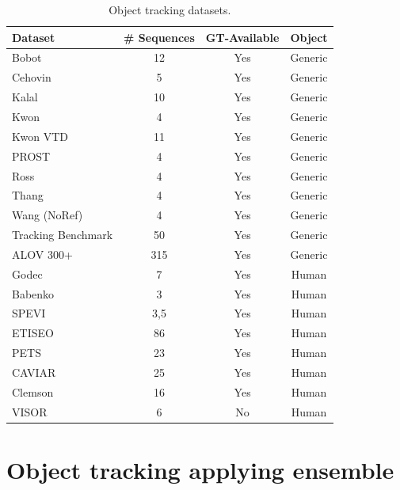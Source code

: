\begin{table}[t!]
\centering
\begin{tabular}{lccc}
\toprule
\textbf{Dataset} & \textbf{\# Sequences} & \textbf{GT-Available} &
\textbf{Object} \\ \midrule
Bobot \cite{KleinIROS10}          & 12       & Yes & Generic \\
Cehovin \cite{Cehovin2013}        & 5        & Yes & Generic \\
Kalal \cite{Kalal2011}            & 10       & Yes & Generic \\
Kwon \cite{KwonL09}               & 4        & Yes & Generic \\
Kwon VTD \cite{KwonL10}           & 11       & Yes & Generic \\
PROST \cite{Santner2010a}         & 4        & Yes & Generic \\
Ross \cite{Ross2007}              & 4        & Yes & Generic \\
Thang \cite{Dinh2011}             & 4        & Yes & Generic \\
Wang (NoRef)                      & 4        & Yes & Generic \\
Tracking Benchmark \cite{Wu2013B} & 50       & Yes & Generic \\
ALOV 300+ \cite{Smeulders2014}    & 315      & Yes & Generic \\
Godec \cite{godec11a}             & 7        & Yes & Human   \\
Babenko \cite{Babenko2010}        & 3        & Yes & Human   \\
SPEVI \cite{Maggio2005}           & 3,5      & Yes & Human   \\
ETISEO \cite{Munder2006}          & 86       & Yes & Human   \\
PETS \cite{PETS}                  & 23 		 & Yes & Human   \\
CAVIAR \cite{Torralba2003}        & 25   	 & Yes & Human   \\
Clemson \cite{Birchfield1998}     & 16       & Yes & Human   \\
VISOR \cite{Vezzani2010}          & 6        & No  & Human   \\
\bottomrule
\end{tabular}
\caption{Object tracking datasets.}
\label{table:datasets}
\end{table}

\section{Object tracking applying ensemble}
\label{sec::ensemble}

